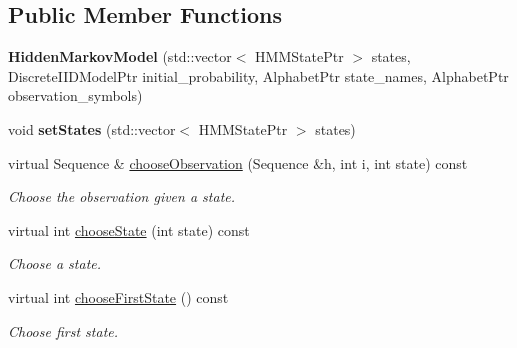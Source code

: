 \subsection*{Public Member Functions}
\begin{DoxyCompactItemize}
\item 
\mbox{\label{classtops_1_1HiddenMarkovModel_ac0cd3b6db315de5f6dd543db4910d4dc}} 
{\bfseries Hidden\+Markov\+Model} (std\+::vector$<$ H\+M\+M\+State\+Ptr $>$ states, Discrete\+I\+I\+D\+Model\+Ptr initial\+\_\+probability, Alphabet\+Ptr state\+\_\+names, Alphabet\+Ptr observation\+\_\+symbols)
\item 
\mbox{\label{classtops_1_1HiddenMarkovModel_ad879a83a5fb6847a8e30ce00572c5a31}} 
void {\bfseries set\+States} (std\+::vector$<$ H\+M\+M\+State\+Ptr $>$ states)
\item 
\mbox{\label{classtops_1_1HiddenMarkovModel_af9085a6ee9df355a207b0090d2eae284}} 
virtual Sequence \& \hyperlink{classtops_1_1HiddenMarkovModel_af9085a6ee9df355a207b0090d2eae284}{choose\+Observation} (Sequence \&h, int i, int state) const
\begin{DoxyCompactList}\small\item\em Choose the observation given a state. \end{DoxyCompactList}\item 
\mbox{\label{classtops_1_1HiddenMarkovModel_a026ac17cc9dbf1f03b74703aa9f48651}} 
virtual int \hyperlink{classtops_1_1HiddenMarkovModel_a026ac17cc9dbf1f03b74703aa9f48651}{choose\+State} (int state) const
\begin{DoxyCompactList}\small\item\em Choose a state. \end{DoxyCompactList}\item 
\mbox{\label{classtops_1_1HiddenMarkovModel_a823d2b105395e8aea75d52f40bb30d55}} 
virtual int \hyperlink{classtops_1_1HiddenMarkovModel_a823d2b105395e8aea75d52f40bb30d55}{choose\+First\+State} () const
\begin{DoxyCompactList}\small\item\em Choose first state. \end{DoxyCompactList}\item 

\end{DoxyCompactItemize}

